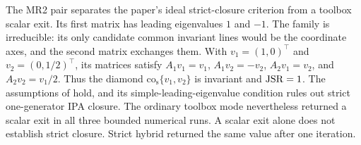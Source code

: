 The MR2 pair separates the paper's ideal strict-closure criterion from a toolbox scalar exit.
Its first matrix has leading eigenvalues $1$ and $-1$.
The family is irreducible: its only candidate common invariant lines would be the coordinate axes, and the second matrix exchanges them.
With $v_1=(1,0)^\top$ and $v_2=(0,1/2)^\top$, its matrices satisfy $A_1v_1=v_1$, $A_1v_2=-v_2$, $A_2v_1=v_2$, and $A_2v_2=v_1/2$.
Thus the diamond $\mathrm{co}_{\mathrm{s}}\{v_1,v_2\}$ is invariant and $\operatorname{JSR}=1$.
The assumptions of \citet[Theorem 2.5]{MejstrikReif2025HybridApproachJSR} hold, and its simple-leading-eigenvalue condition rules out strict one-generator IPA closure.
The ordinary toolbox mode nevertheless returned a scalar exit in all three bounded numerical runs.
A scalar exit alone does not establish strict closure.
Strict hybrid returned the same value after one iteration.
